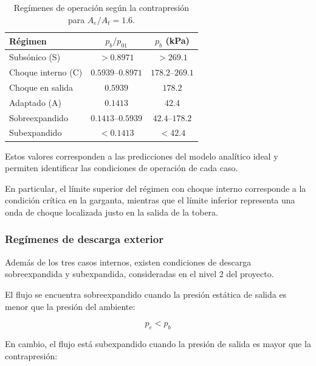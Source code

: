 \documentclass[12pt,letterpaper]{article}
\numberwithin{equation}{section}
\begin{document}
\begin{table}[htbp]
    \centering
    \caption{Regímenes de operación según
    la contrapresión para $A_e/A_t=1.6$.}
    \label{tab:regimenes_tobera}
    \renewcommand{\arraystretch}{1.3}
    \small
    \begin{tabular}{|l|c|c|}
        \hline
        \textbf{Régimen} &
        \textbf{$p_b/p_{01}$} &
        \textbf{$p_b$ (kPa)} \\
        \hline
        Subsónico (S) &
        $>0.8971$ &
        $>269.1$ \\
        \hline
        Choque interno (C) &
        $0.5939$--$0.8971$ &
        $178.2$--$269.1$ \\
        \hline
        Choque en salida &
        $0.5939$ &
        $178.2$ \\
        \hline
        Adaptado (A) &
        $0.1413$ &
        $42.4$ \\
        \hline
        Sobreexpandido &
        $0.1413$--$0.5939$ &
        $42.4$--$178.2$ \\
        \hline
        Subexpandido &
        $<0.1413$ &
        $<42.4$ \\
        \hline
    \end{tabular}
\end{table}

Estos valores corresponden a las predicciones
del modelo analítico ideal y permiten
identificar las condiciones de operación
de cada caso.

En particular, el límite superior del
régimen con choque interno corresponde
a la condición crítica en la garganta,
mientras que el límite inferior representa
una onda de choque localizada justo
en la salida de la tobera.

\subsubsection{Regímenes de descarga exterior}

Además de los tres casos internos, existen
condiciones de descarga sobreexpandida y
subexpandida, consideradas en el nivel 2
del proyecto.

El flujo se encuentra sobreexpandido cuando
la presión estática de salida es menor que
la presión del ambiente:

\begin{equation}
    p_e<p_b
\end{equation}

En cambio, el flujo está subexpandido cuando
la presión de salida es mayor que la
contrapresión:
\end{document}

